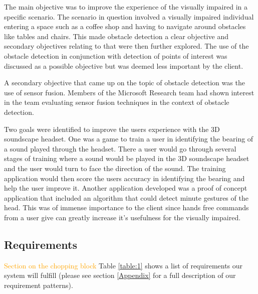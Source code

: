 \documentclass[prodmode,acmtosem]{acmsmall} %
\begin{document}
The main objective was to improve the experience of the visually impaired in a specific scenario. The scenario in question involved a visually impaired individual entering a space such as a coffee shop and having to navigate around obstacles like tables and chairs.
This made obstacle detection a clear objective and secondary objectives relating to that were then further explored. The use of the obstacle detection in conjunction with detection of points of interest was discussed as a possible objective but was deemed less important by the client.

A secondary objective that came up on the topic of obstacle detection was the use of sensor fusion. Members of the Microsoft Research team had shown interest in the team evaluating sensor fusion techniques in the context of obstacle detection.

Two goals were identified to improve the users experience with the 3D soundscape headset. One was a game to train a user in identifying the bearing of a sound played through the headset. There a user would go through several stages of training where a sound would be played in the 3D soundscape headset and the user would turn to face the direction of the sound. The training application would then score the users accuracy in identifying the bearing and help the user improve it.
Another application developed was a proof of concept application that included an algorithm that could detect minute gestures of the head. This was of immense importance to the client since hands free commands from a user give can greatly increase it's usefulness for the visually impaired.



\subsection{Requirements}
\textcolor{orange}{Section on the chopping block}
Table \ref{table:1} shows a list of requirements our system will fulfill (please see section \ref{Appendix} for a full description of our requirement patterns).\\

\renewcommand{\arraystretch}{1.5}
\end{document}
